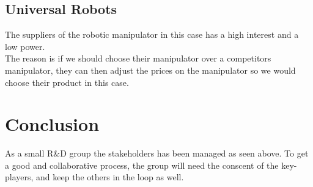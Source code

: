 \subsection{Universal Robots}\label{ch:Universalrobots-stake}
The suppliers of the robotic manipulator in this case has a high interest and a low power.\\The reason is if we should choose their manipulator over a competitors manipulator, they can then adjust the prices on the manipulator so we would choose their product in this case. \\


\section{Conclusion}
As a small R\&D group the stakeholders has been managed as seen above. To get a good and collaborative process, the group will need the conscent of the key-players, and keep the others in the loop as well. 


